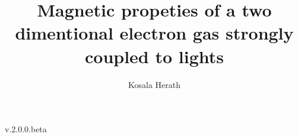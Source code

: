 \documentclass[a4paper]{article}
\title{Magnetic propeties of a two dimentional electron gas strongly coupled to lights}
\author{Kosala Herath}
\numberwithin{equation}{subsection}
\numberwithin{equation}{section}
\begin{document}
\maketitle

\begin{center}
{v.2.0.0.beta}
\end{center}

% 
% 
% 
% 
% 

\newpage

\end{document}

